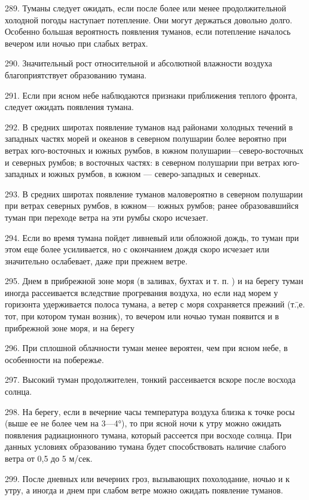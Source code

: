 289. Туманы следует ожидать, если после более или менее продолжительной холодной погоды наступает потепление. Они могут держаться довольно долго. Особенно большая вероятность появления туманов, если потепление началось вечером или ночью при слабых ветрах.

290. Значительный рост относительной и абсолютной влажности воздуха благоприятствует образованию тумана.

291. Если при ясном небе наблюдаются признаки приближения теплого фронта, следует ожидать появления тумана.

292. В средних широтах появление туманов над районами холодных течений в западных частях морей и океанов в северном полушарии более вероятно при ветрах юго-восточных и южных румбов, в южном полушарии—северо-восточных и северных румбов; в восточных частях: в северном полушарии при ветрах юго-западных и южных румбов, в южном — северо-западных и северных.

293. В средних широтах появление туманов маловероятно в северном полушарии при ветрах северных румбов, в южном— южных румбов; ранее образовавшийся туман при переходе ветра на эти румбы скоро исчезает.

294. Если во время тумана пойдет ливневый или обложной дождь, то туман при этом еще более усиливается, но с окончанием дождя скоро исчезает или значительно ослабевает, даже при прежнем ветре.

295. Днем в прибрежной зоне моря (в заливах, бухтах и т. п. ) и на берегу туман иногда рассеивается вследствие прогревания воздуха, но если над морем у горизонта удерживается полоса тумана, а ветер с моря сохраняется прежний (т.\=,е. тот, при котором туман возник), то вечером или ночью туман появится и в прибрежной зоне моря, и на берегу

296. При сплошной облачности туман менее вероятен, чем при ясном небе, в особенности на побережье.

297. Высокий туман продолжителен, тонкий рассеивается вскоре после восхода солнца.

298. На берегу, если в вечерние часы температура воздуха близка к точке росы (выше ее не более чем на 3—4°), то при ясной ночи к утру можно ожидать появления радиационного тумана, который рассеется при восходе солнца. При данных условиях образованию тумана будет способствовать наличие слабого ветра от 0,5 до 5 м/сек.

299. После дневных или вечерних гроз, вызывающих похолодание, ночью и к утру, а иногда и днем при слабом ветре можно ожидать появление туманов.

